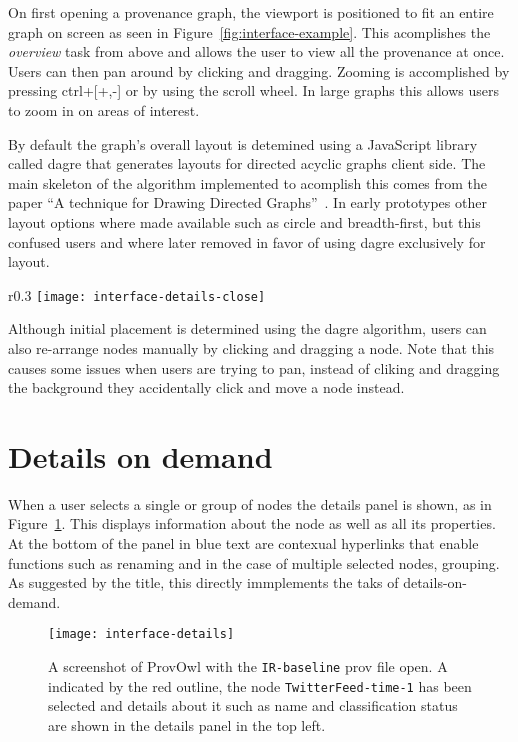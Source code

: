 On first opening a provenance graph, the viewport is positioned to fit an entire graph on screen as seen in Figure~\ref{fig:interface-example}. This acomplishes the \textit{overview} task from above and allows the user to view all the provenance at once. Users can then pan around by clicking and dragging. Zooming is accomplished by pressing ctrl+[+,-] or by using the scroll wheel. In large graphs this allows users to zoom in on areas of interest. 

By default the graph's overall layout is detemined using a JavaScript library called dagre that generates layouts for directed acyclic graphs client side. The main skeleton of the algorithm implemented to acomplish this comes from the paper ``A technique for Drawing Directed Graphs''~\cite{Gansner1993}. In early prototypes other layout options where made available such as circle and breadth-first, but this confused users and where later removed in favor of using dagre exclusively for layout.

\begin{wrapfigure}{r}{0.3\textwidth}
	\centering
	\texttt{[image: interface-details-close]}
	\caption{A close up of the details panel from Figure~\ref{fig:interface-details}}
	\label{fig:key-concepts}
\end{wrapfigure}

Although initial placement is determined using the dagre algorithm, users can also re-arrange nodes manually by clicking and dragging a node. Note that this causes some issues when users are trying to pan, instead of cliking and dragging the background they accidentally click and move a node instead.

\section{Details on demand}
\label{sec:details_on_demand}

When a user selects a single or group of nodes the details panel is shown, as in Figure~\ref{fig:interface-details}. This displays information about the node as well as all its properties. At the bottom of the panel in blue text are contexual hyperlinks that enable functions such as renaming and in the case of multiple selected nodes, grouping. As suggested by the title, this directly immplements the taks of details-on-demand.

\begin{figure}[h]
	\centering
	\texttt{[image: interface-details]}
	\caption{A screenshot of ProvOwl with the \texttt{IR-baseline} prov file open. A indicated by the red outline, the node \texttt{TwitterFeed-time-1} has been selected and details about it such as name and classification status are shown in the details panel in the top left.}
	\label{fig:interface-details}
\end{figure}

